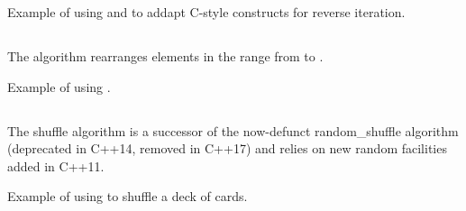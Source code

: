 \begin{box-note}
\footnotesize Example of using  and  to addapt C-style constructs for reverse iteration.
\tcblower
{}
\end{box-note}

\subsection{\texorpdfstring{}{\texttt{std::rotate}}}

The  algorithm rearranges elements in the range from \cpp{[first, middle),[middle, last)} to \cpp{[middle, last),[first, middle)}.


\begin{box-note}
\footnotesize Example of using .
\tcblower
{}
\end{box-note}

\subsection{\texorpdfstring{}{\texttt{std::shuffle}}}

The shuffle algorithm is a successor of the now-defunct random\_shuffle algorithm (deprecated in C++14, removed in C++17) and relies on new random facilities added in C++11.


\begin{box-note}
\footnotesize Example of using  to shuffle a deck of cards.
\tcblower
{}
\end{box-note}


